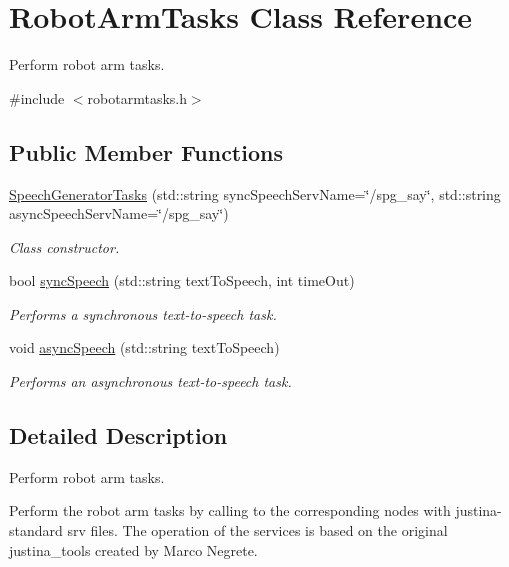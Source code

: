 \hypertarget{class_robot_arm_tasks}{}\section{Robot\+Arm\+Tasks Class Reference}
\label{class_robot_arm_tasks}


Perform robot arm tasks.  




{\ttfamily \#include $<$robotarmtasks.\+h$>$}

\subsection*{Public Member Functions}
\begin{DoxyCompactItemize}
\item 
\hyperlink{class_robot_arm_tasks_a87a784769faa11227c32985d7fb16f35}{Speech\+Generator\+Tasks} (std\+::string sync\+Speech\+Serv\+Name=\char`\"{}/spg\+\_\+say\char`\"{}, std\+::string async\+Speech\+Serv\+Name=\char`\"{}/spg\+\_\+say\char`\"{})
\begin{DoxyCompactList}\small\item\em Class constructor. \end{DoxyCompactList}\item 
bool \hyperlink{class_robot_arm_tasks_a0936c7110aa3590770ceef70ca630b84}{sync\+Speech} (std\+::string text\+To\+Speech, int time\+Out)
\begin{DoxyCompactList}\small\item\em Performs a synchronous text-\/to-\/speech task. \end{DoxyCompactList}\item 
void \hyperlink{class_robot_arm_tasks_a93f6b506f364295db0ba20edd57318df}{async\+Speech} (std\+::string text\+To\+Speech)
\begin{DoxyCompactList}\small\item\em Performs an asynchronous text-\/to-\/speech task. \end{DoxyCompactList}\end{DoxyCompactItemize}


\subsection{Detailed Description}
Perform robot arm tasks. 

Perform the robot arm tasks by calling to the corresponding nodes with justina-\/standard srv files. The operation of the services is based on the original justina\+\_\+tools created by Marco Negrete.

